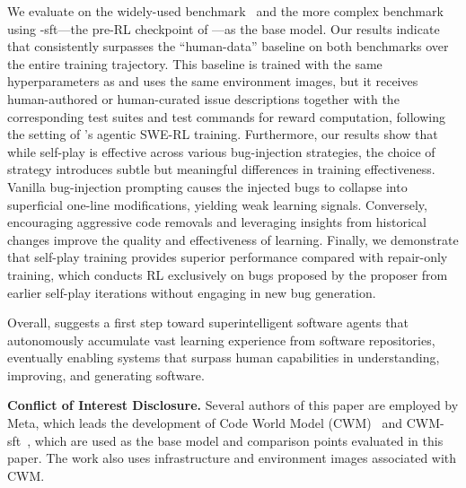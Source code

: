 We evaluate \tech on the widely-used \sbv benchmark~\cite{swebench,swebverified} and the more complex \sbp benchmark~\cite{deng2025swebenchproaiagents} using \cwm-sft---the pre-RL checkpoint of \cwm---as the base model.
Our results indicate that \tech consistently surpasses the ``human-data'' baseline on both benchmarks over the entire training trajectory. This baseline is trained with the same hyperparameters as \tech and uses the same environment images, but it receives human-authored or human-curated issue descriptions together with the corresponding test suites and test commands for reward computation, following the setting of \cwm’s agentic SWE-RL training.
Furthermore, our results show that while self-play is effective across various bug-injection strategies, the choice of strategy introduces subtle but meaningful differences in training effectiveness. Vanilla bug-injection prompting causes the injected bugs to collapse into superficial one-line modifications, yielding weak learning signals. Conversely, encouraging aggressive code removals and leveraging insights from historical changes improve the quality and effectiveness of learning.
Finally, we demonstrate that self-play training provides superior performance compared with repair-only training, which conducts RL exclusively on bugs proposed by the proposer from earlier self-play iterations without engaging in new bug generation.

Overall, \techfull suggests a first step toward superintelligent software agents that autonomously accumulate vast learning experience from software repositories, eventually enabling systems that surpass human capabilities in understanding, improving, and generating software.

\textbf{Conflict of Interest Disclosure.} Several authors of this paper are employed by Meta, which leads the development of Code World Model (CWM)~\cite{faircodegenteam2025cwmopenweightsllmresearch} and CWM-sft~\cite{cwmsft}, which are used as the base model and comparison points evaluated in this paper. The work also uses infrastructure and environment images associated with CWM.




